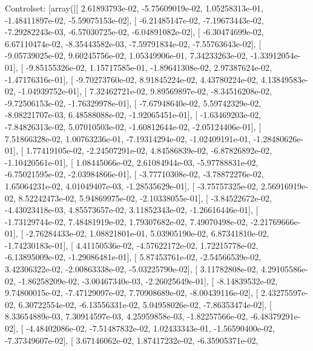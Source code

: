 \documentclass{article}
\begin{document}
Controlset: [array([[  2.61893793e-02,  -5.75609019e-02,   1.05258313e-01,
         -1.48411897e-02,  -5.59075153e-02],
       [ -6.21485147e-02,  -7.19673443e-02,  -7.29282243e-03,
         -6.57030725e-02,  -6.04891082e-02],
       [ -6.30474699e-02,   6.67110474e-02,  -8.35443582e-03,
         -7.59791834e-02,  -7.55763643e-02],
       [ -9.05739025e-02,   9.60245756e-02,   1.05349906e-01,
          7.34233263e-02,  -1.33912054e-01],
       [ -9.85155326e-02,   1.15717585e-01,  -1.89641308e-02,
          2.97387624e-02,  -1.47176316e-01],
       [ -9.70273760e-02,   8.91845224e-02,   4.43780224e-02,
          4.13849583e-02,  -1.04939752e-01],
       [  7.32462721e-02,   9.89569897e-02,  -8.34516208e-02,
         -9.72506153e-02,  -1.76329978e-01],
       [ -7.67948640e-02,   5.59742329e-02,  -8.08221707e-03,
          6.48588088e-02,  -1.92065451e-01],
       [ -1.63469203e-02,  -7.84826313e-02,   5.07010503e-02,
         -1.60812644e-02,  -2.05124406e-01],
       [  7.51866328e-02,   1.00763236e-01,  -7.19314294e-02,
         -1.02409191e-01,  -1.28480626e-01],
       [  1.77419105e-02,  -2.24507291e-02,   4.84586839e-02,
         -6.87826892e-02,  -1.10420561e-01],
       [  1.08445066e-02,   2.61084944e-03,  -5.97788831e-02,
         -6.75021595e-02,  -2.03984866e-01],
       [ -3.77710308e-02,  -3.78872276e-02,   1.65064231e-02,
          4.01049407e-03,  -1.28535629e-01],
       [ -3.75757325e-02,   2.56916919e-02,   8.52242473e-02,
          5.94869975e-02,  -2.10338055e-01],
       [ -3.84522672e-02,  -4.43023418e-03,   4.85573657e-02,
          3.11852343e-02,  -1.26616446e-01],
       [ -1.73129744e-02,   7.48481919e-02,   1.79307682e-02,
          7.49070498e-02,  -2.21769666e-01],
       [ -2.76284433e-02,   1.08821801e-01,   5.03905190e-02,
          6.87341810e-02,  -1.74230183e-01],
       [  4.41150536e-02,  -4.57622172e-02,   1.72215778e-02,
         -6.13895009e-02,  -1.29086481e-01],
       [  5.87453761e-02,  -2.54566539e-02,   3.42306322e-02,
         -2.00863338e-02,  -5.03225790e-02],
       [  3.11782808e-02,   4.29105586e-02,  -1.86258209e-02,
         -3.00467340e-03,  -2.26025649e-01],
       [ -8.14839532e-02,   9.74800015e-02,  -7.47129097e-02,
          7.70908689e-02,  -8.00439116e-02],
       [  2.43275597e-02,   6.30722554e-02,  -6.13556331e-02,
          5.04958026e-02,  -7.86353474e-02],
       [  8.33654889e-03,   7.30914597e-03,   4.25959858e-03,
         -1.82257566e-02,  -6.48379291e-02],
       [ -4.48402086e-02,  -7.51487832e-02,   1.02433343e-01,
         -1.56590400e-02,  -7.37349607e-02],
       [  3.67146062e-02,   1.87417232e-02,  -6.35905371e-02,
\end{document}
